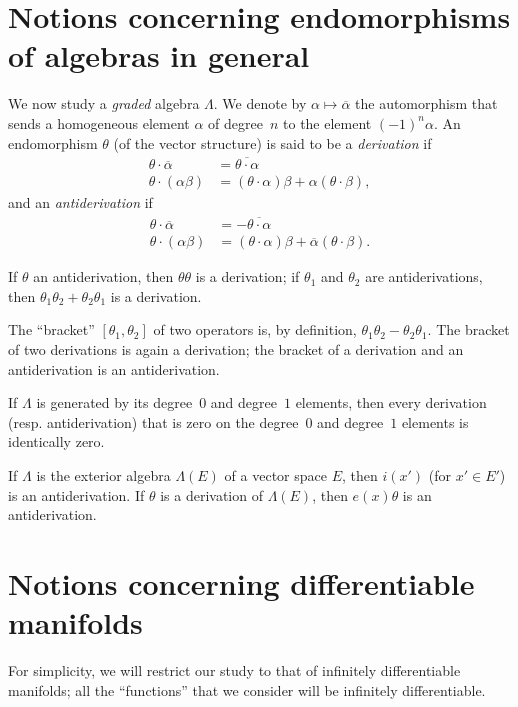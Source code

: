 \documentclass{article}
\begin{document}
\section{Notions concerning endomorphisms of algebras in general}
\label{I.3}

We now study a \emph{graded} algebra $\Lambda$.
We denote by $\alpha\mapsto\overline{\alpha}$ the automorphism that sends a homogeneous element $\alpha$ of degree~$n$ to the element $(-1)^n\alpha$.
An endomorphism $\theta$ (of the vector structure) is said to be a \emph{derivation} if
\[
  \begin{aligned}
    \theta\cdot\overline{\alpha}
    &= \overline{\theta\cdot\alpha}
  \\\theta\cdot(\alpha\beta)
    &= (\theta\cdot\alpha)\beta + \alpha(\theta\cdot\beta),
  \end{aligned}
\]
and an \emph{antiderivation} if
\[
  \begin{aligned}
    \theta\cdot\overline{\alpha}
    &= -\overline{\theta\cdot\alpha}
  \\\theta\cdot(\alpha\beta)
    &= (\theta\cdot\alpha)\beta + \overline{\alpha}(\theta\cdot\beta).
  \end{aligned}
\]

If $\theta$ an antiderivation, then $\theta\theta$ is a derivation;
if $\theta_1$ and $\theta_2$ are antiderivations, then  $\theta_1\theta_2+\theta_2\theta_1$ is a derivation.

The ``bracket'' $[\theta_1,\theta_2]$ of two operators is, by definition, $\theta_1\theta_2-\theta_2\theta_1$.
The bracket of two derivations is again a derivation;
the bracket of a derivation and an antiderivation is an antiderivation.

If $\Lambda$ is generated by its degree~$0$ and degree~$1$ elements, then every derivation (resp. antiderivation) that is zero on the degree~$0$ and degree~$1$ elements is identically zero.

If $\Lambda$ is the exterior algebra $\Lambda(E)$ of a vector space $E$, then $i(x')$ (for $x'\in E'$) is an antiderivation.
If $\theta$ is a derivation of $\Lambda(E)$, then $e(x)\theta$ is an antiderivation.


\section{Notions concerning differentiable manifolds}
\label{I.4}

For simplicity, we will restrict our study to that of infinitely differentiable manifolds;
all the ``functions'' that we consider will be infinitely differentiable.
\end{document}
